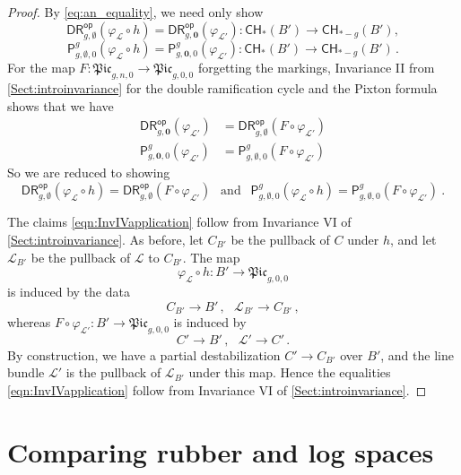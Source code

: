 \documentclass[a4paper,12pt]{article} %
\newcommand{\bb}[1]{{\mathbb{#1}}}
\newcommand{\ca}[1]{{\mathcal{#1}}}
\newcommand{\bd}[1]{{\mathbf{#1}}}
\def\P{\mathsf{P}}
\theoremstyle{definition}
\theoremstyle{plain}%
\renewcommand{\phi}{\varphi}
\newcommand{\Picabs}{\mathfrak{Pic}}
\newcommand{\Chow}{\mathsf{CH}}
\newcommand{\invnrn}{II}
\newcommand{\invnrIV}{VI}
\newcommand{\DRop}{\mathsf{DR}^{\mathsf{op}}}
\begin{document}
\begin{proof}
By \eqref{eq:an_equality}, we need only show 
\begin{equation}\label{eq:pullback_Div}
\DRop_{g, \emptyset}(\phi_\ca L\circ h)  =  \DRop_{g,\bd 0}(\phi_{\ca L'})
:\Chow_*(B') \to \Chow_{*-g}(B'),
\end{equation}
\begin{equation}\label{eq:pullback_pixton}
\P_{g,\emptyset, 0}^g(\phi_\ca L \circ h) = \P_{g,\bd 0, 0}^g(\phi_{\ca L'})
:\Chow_*(B') \to \Chow_{*-g}(B')
\, .
\end{equation}
For the map $F : \Picabs_{g,n,0} \to \Picabs_{g,0,0}$ forgetting the markings, Invariance \invnrn{} from \cref{Sect:introinvariance} for the double ramification cycle and the Pixton formula shows that
we have
\begin{align*}
\DRop_{g,\bd 0}(\phi_{\ca L'})
&= \DRop_{g,\emptyset}(F \circ \phi_{\ca L'})  \\
\P_{g,\bd 0, 0}^g(\phi_{\ca L'}) 
&= \P_{g,\emptyset, 0}^g(F \circ \phi_{\ca L'})
\end{align*}
So we are reduced to showing
\begin{equation} \label{eqn:InvIVapplication}
    \DRop_{g, \emptyset}(\phi_\ca L\circ h) = \DRop_{g, \emptyset}(F \circ \phi_{\ca L'})\ \ \text{ and }\ \ \P_{g,\emptyset, 0}^g(\phi_\ca L\circ h) = \P_{g,\emptyset, 0}^g(F \circ \phi_{\ca L'})\ .
\end{equation}


The claims \eqref{eqn:InvIVapplication} follow from
 Invariance \invnrIV{} of \cref{Sect:introinvariance}. As before, let
 $C_{B'}$ be the pullback of $C$ under $h$,  and let
 $\ca L_{B'}$ be the pullback of $\ca L$ to $C_{B'}$. The map 
 $$\phi_\ca L\circ h  : B' \to \Picabs_{g,0,0}$$
 is induced by the data
\[C_{B'} \to B'\, ,\ \ \ \ca L_{B'} \to C_{B'}\, ,\]
whereas $F \circ \phi_{\ca L'} : B' \to \Picabs_{g,0,0}$ is induced by
\[C' \to B'\, ,\ \ \  \ca L'\to C'\,.\]
By construction, we have a partial destabilization $C' \to C_{B'}$ over $B'$, and the line bundle $\ca L'$ is the pullback of $\ca L_{B'}$ under this map. Hence the equalities \eqref{eqn:InvIVapplication} follow from Invariance \invnrIV{} of \cref{Sect:introinvariance}.
\end{proof}




\section{Comparing rubber and log spaces}\label{sec:comparing_stacks}
\end{document}
